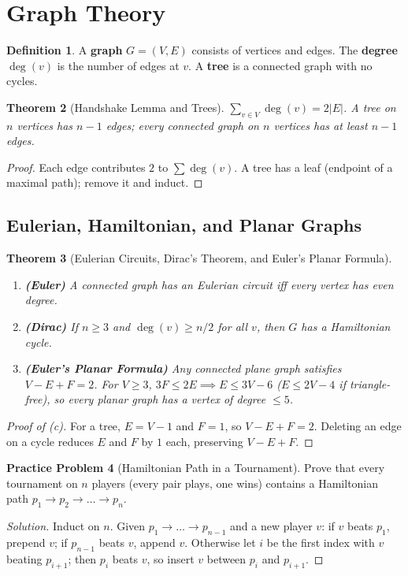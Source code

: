 \documentclass[11pt]{article}
\theoremstyle{plain}
\newtheorem{theorem}{Theorem}[section]
\theoremstyle{definition}
\newtheorem{definition}[theorem]{Definition}
\newtheorem{problem}[theorem]{Practice Problem}
\newenvironment{solution}{\begin{proof}[Solution]}{\end{proof}}
\begin{document}
\section{Graph Theory}

\begin{definition}
A \textbf{graph} $G=(V,E)$ consists of vertices and edges. The \textbf{degree} $\deg(v)$ is the number of edges at $v$. A \textbf{tree} is a connected graph with no cycles.
\end{definition}

\begin{theorem}[Handshake Lemma and Trees]
$\sum_{v\in V}\deg(v) = 2|E|$. A tree on $n$ vertices has $n-1$ edges; every connected graph on $n$ vertices has at least $n-1$ edges.
\end{theorem}
\begin{proof}
Each edge contributes $2$ to $\sum\deg(v)$. A tree has a leaf (endpoint of a maximal path); remove it and induct.
\end{proof}

\subsection{Eulerian, Hamiltonian, and Planar Graphs}

\begin{theorem}[Eulerian Circuits, Dirac's Theorem, and Euler's Planar Formula]
\leavevmode
\begin{enumerate}[label=(\alph*)]
\item \textbf{(Euler)} A connected graph has an Eulerian circuit iff every vertex has even degree.
\item \textbf{(Dirac)} If $n \ge 3$ and $\deg(v) \ge n/2$ for all $v$, then $G$ has a Hamiltonian cycle.
\item \textbf{(Euler's Planar Formula)} Any connected plane graph satisfies $V - E + F = 2$. For $V \ge 3$, $3F \le 2E \implies E \le 3V - 6$ ($E \le 2V - 4$ if triangle-free), so every planar graph has a vertex of degree $\le 5$.
\end{enumerate}
\end{theorem}
\begin{proof}[Proof of (c)]
For a tree, $E=V-1$ and $F=1$, so $V-E+F=2$. Deleting an edge on a cycle reduces $E$ and $F$ by $1$ each, preserving $V-E+F$.
\end{proof}

\begin{problem}[Hamiltonian Path in a Tournament]
Prove that every tournament on $n$ players (every pair plays, one wins) contains a Hamiltonian path $p_1 \to p_2 \to \dots \to p_n$.
\end{problem}
\begin{solution}
Induct on $n$. Given $p_1 \to \dots \to p_{n-1}$ and a new player $v$: if $v$ beats $p_1$, prepend $v$; if $p_{n-1}$ beats $v$, append $v$. Otherwise let $i$ be the first index with $v$ beating $p_{i+1}$; then $p_i$ beats $v$, so insert $v$ between $p_i$ and $p_{i+1}$.
\end{solution}
\end{document}
